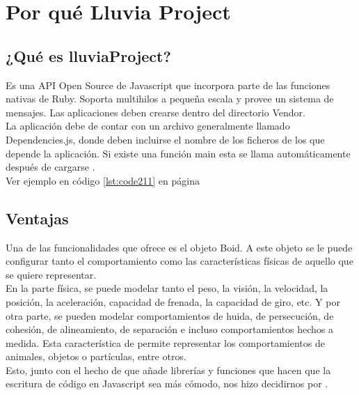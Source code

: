 \section{Por qué Lluvia Project}
\label{section:por_que}

\subsection{¿Qué es lluviaProject?}
\label{subsection:que_es}

Es una API Open Source de Javascript que incorpora parte de las funciones nativas de Ruby. Soporta multihilos a pequeña escala y provee un 
sistema de mensajes. Las aplicaciones deben crearse dentro del directorio Vendor. \\

La aplicación debe de contar con un archivo generalmente llamado Dependencies.js, donde deben incluirse el nombre de los ficheros de los que 
depende la aplicación. Si existe una función main esta se llama automáticamente después de cargarse \lluvia.\\

Ver ejemplo en código \ref{lst:code211} en página \pageref{lst:code211}


\subsection{Ventajas}
\label{subsection:ventajas}


Una de las funcionalidades que ofrece \lluvia{} es el objeto Boid. A este objeto se le puede configurar tanto el comportamiento como las 
características físicas de aquello que se quiere representar.\\

En la parte física, se puede modelar tanto el peso, la visión, la velocidad, la posición, la aceleración, capacidad de frenada, la capacidad 
de giro, etc. Y por otra parte, se pueden modelar comportamientos de huida, de persecución, de cohesión, de alineamiento, de separación e 
incluso comportamientos hechos a medida. Esta característica de \lluvia{} permite representar los comportamientos de animales, objetos 
o partículas, entre otros.\\

Esto, junto con el hecho de que añade librerías y funciones que hacen que la escritura de código en Javascript sea más cómodo, nos hizo 
decidirnos por \lluvia{}.\\
